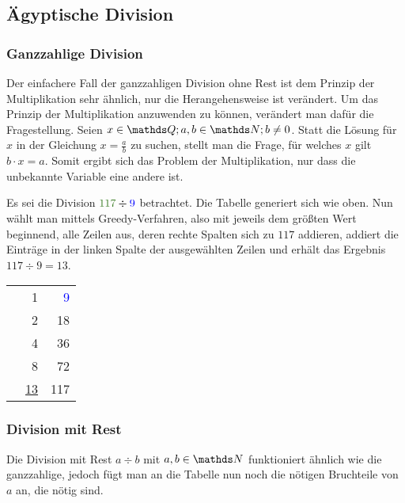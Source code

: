 \subsection{Ägyptische Division}
	\subsubsection{Ganzzahlige Division}
	Der einfachere Fall der ganzzahligen Division ohne Rest ist dem Prinzip der Multiplikation sehr ähnlich, nur die Herangehensweise ist verändert. Um das Prinzip der Multiplikation anzuwenden zu können, verändert man dafür die Fragestellung. 
	Seien $x \in \Q; a,b\in \N; b \neq 0$. Statt die Lösung für $x$ in der Gleichung $x=\frac{a}{b}$ zu suchen, stellt man die Frage, für welches $x$ gilt $b \cdot x = a$. Somit ergibt sich das Problem der Multiplikation, nur dass die unbekannte Variable eine andere ist.
	
	\begin{bsp}
		Es sei die Division $\textcolor{OliveGreen}{117} \div \textcolor{blue}{9}$ betrachtet. Die Tabelle generiert sich wie oben. Nun wählt man mittels Greedy-Verfahren, also mit jeweils dem größten Wert beginnend, alle Zeilen aus, deren rechte Spalten sich zu $117$ addieren, addiert die Einträge in der linken Spalte der ausgewählten Zeilen und erhält das Ergebnis $117 \div 9 = 13$.
		\begin{center}
			\begin{tabular}{r r r}
				\checkmark & 1 & \textcolor{blue}{9}\\
				& 2 & 18\\
				\checkmark & 4 & 36\\
				\checkmark & 8 & 72\\ \hline
				& \underline{\underline{13}} & \textcolor{OliveGreen}{117}
			\end{tabular}
		\end{center}
	\end{bsp}

	\subsubsection{Division mit Rest}
	Die Division mit Rest $a \div b$ mit $a, b \in \N$ funktioniert ähnlich wie die ganzzahlige, jedoch fügt man an die Tabelle nun noch die nötigen Bruchteile von $a$ an, die nötig sind.
	
